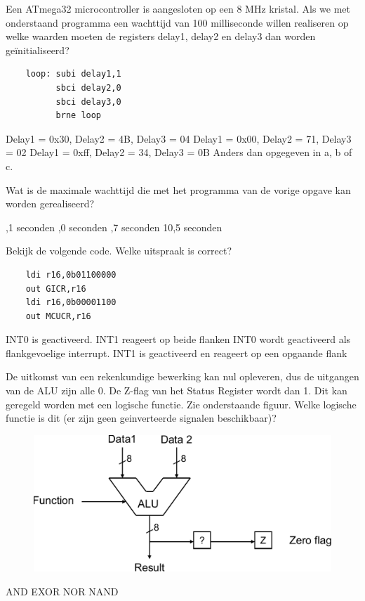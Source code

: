 \documentclass[a4paper,12pt,fleqn,dutch,mimicwordtwentyten]{tisdexam}
\begin{document}
\begin{questions}
\question
\label{opg:opg10}
Een ATmega32 microcontroller is aangesloten op een 8 MHz kristal.
Als we met onderstaand programma een wachttijd van 100 milliseconde
willen realiseren op welke waarden moeten de registers delay1, delay2 en
delay3 dan worden ge\"{i}nitialiseerd?
\begin{lstlisting}
    loop: subi delay1,1
          sbci delay2,0
          sbci delay3,0
          brne loop
\end{lstlisting}
\begin{choices}
	\choice Delay1 = 0x30, Delay2 = 4B, Delay3 = 04
	\CorrectChoice \label{ans:opg10} Delay1 = 0x00, Delay2 = 71, Delay3 = 02
	\choice Delay1 = 0x{f}{f}, Delay2 = 34, Delay3 = 0B
	\choice Anders dan opgegeven in a, b of c.
\end{choices}


\question
\label{opg:opg11}
Wat is de maximale wachttijd die met het programma van de vorige opgave kan worden
gerealiseerd?
\begin{choices}
	,1 seconden
	,0 seconden
	,7 seconden
	\CorrectChoice \label{ans:opg11} 10,5 seconden
\end{choices}


\question
\label{opg:opg12}
Bekijk de volgende code. Welke uitspraak is correct?
\begin{lstlisting}
    ldi r16,0b01100000
    out GICR,r16
    ldi r16,0b00001100
    out MCUCR,r16
\end{lstlisting}
\begin{choices}
	\CorrectChoice \label{ans:opg12} INT0 is geactiveerd.
	\choice INT1 reageert op beide flanken
	\choice INT0 wordt geactiveerd als flankgevoelige interrupt.
	\choice INT1 is geactiveerd en reageert op een opgaande flank
\end{choices}


\question
\label{opg:opg13}
De uitkomst van een rekenkundige bewerking kan nul opleveren, dus de uitgangen van de
ALU zijn alle 0. De Z-flag van het Status Register wordt dan 1. Dit kan geregeld worden met een
logische functie. Zie onderstaande figuur. Welke logische functie is dit (er zijn geen
geinverteerde signalen beschikbaar)?
\begin{figure}[H]
  \centering
    \includegraphics[scale=0.55]{pINLMIC_zero_flag.pdf}
\end{figure}
\begin{choices}
	\choice AND
	\choice EXOR
	\CorrectChoice \label{ans:opg13} NOR
	\choice NAND
\end{choices}



\end{questions}
\end{document}
